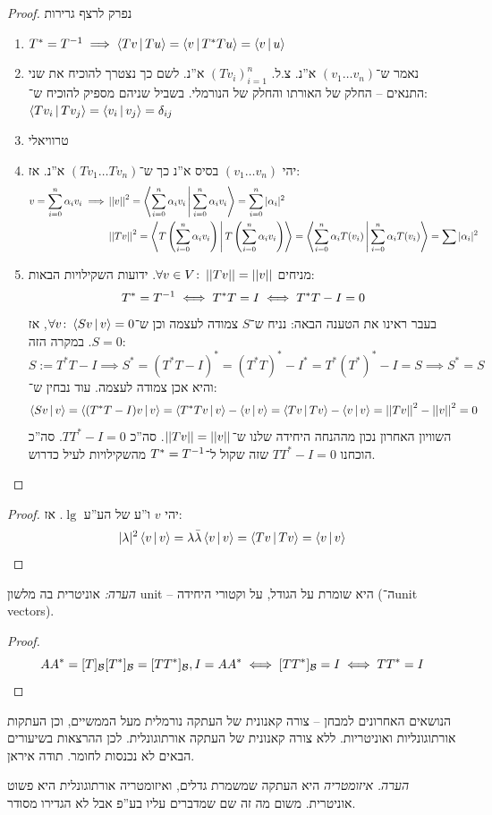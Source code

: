 \documentclass[]{../../../../tex/classes/styledArticle}
\begin{document}
	\begin{proof}נפרק לרצף גרירות
		\begin{enumerate}
			\item[$1 \to 2$] \hfil $T^* = T\op \implies \mut{Tv}{Tu} = \mut{v}{T^*Tu} = \mut{v}{u}$
			\item[$2 \to 3$] נאמר ש־$(v_1 \dots v_n)$ א''נ. צ.ל. $(Tv_i)_{i = 1}^{n}$ א''נ. לשם כך נצטרך להוכיח את שני התנאים – החלק של האורתו והחלק של הנורמלי. בשביל שניהם מספיק להוכיח ש־: 
				$\mut{Tv_i}{Tv_j} = \mut{v_i}{v_j}  = \dg_{ij}$
			\item[$3 \to 4$]טרוויאלי
			\item[$4 \to 5$]יהי $(v_1 \dots v_n)$ בסיס א''נ כך ש־$(Tv_1 \dots Tv_n)$ א''נ. אז: 
			\begin{align*}
				v = \sumni \ag_i v_i \implies &\norm{v}^2 = \mut{\sumni \ag_i v_i}{\sumni \ag_i v_i} = \sumni |\ag_i|^2 \\
				&\norm{Tv}^2 = \mut{T\cl{\sumni \ag_i v_i}}{T\cl{\sumni \ag_i v_i}} = \mut{\sumni \ag_i T(v_i)}{\sumni \ag_i T(v_i)} = \sum |\ag_i|^2
			\end{align*}
			\item[$5 \to 1$]מניחים $\forall v \in V \co \norm{Tv} = \norm{v}$. ידועות השקילויות הבאות: 
			\[ T^* = T\op \iff T^*T = I \iff T^*T - I = 0 \]
			בעבר ראינו את הטענה הבאה: נניח ש־$S$ צמודה לעצמה וכן ש־$\forall v \co \mut{Sv}{v} = 0$, אז $S = 0$. במקרה הזה: 
			\[ S := T^*T - I \implies S^* = (T^*T - I)^* = (T^*T)^* - I^* = T^*(T^*)^* - I =S \implies S^* = S \]
			והיא אכן צמודה לעצמה. עוד נבחין ש־: 
			\[ \mut{Sv}{v} = \mut{(T^* T - I)v}{v} =\mut{T^*Tv}{v} - \mut{v}{v} = \mut{Tv}{Tv} - \mut{v}{v} = \norm{Tv}^2 - \norm{v}^2 = 0 \]
			השוויון האחרון נכון מההנחה היחידה שלנו ש־$\norm{Tv} = \norm{v}$. סה''כ $TT^* - I = 0$. סה''כ הוכחנו $TT^* - I = 0$ שזה שקול ל־$T^* = T\op$ מהשקילויות לעיל כדרוש. 
		\end{enumerate}
	\end{proof}
	
	 \begin{proof}
		יהי $v$ ו''ע של הע''ע $\lg$. אז: 
		\[ |\lg|^2 \mut{v}{v} = \lg\bar\lg \mut{v}{v} = \mut{Tv}{Tv} = \mut{v}{v} \]
	\end{proof}
	\textit{הערה: }אוניטרית בה מלשון unit – היא שומרת על הגודל, על וקטורי היחידה (ה־unit vectors). 
	\begin{proof}
		\[ AA^* = [T]_\bc[T^*]_\bc = [TT^*]_\bc, I = AA^* \iff [TT^*]_\bc = I \iff TT^* = I \]
	\end{proof}
	
	הנושאים האחרונים למבחן – צורה קאנונית של העתקה נורמלית מעל הממשיים, וכן העתקות אורתוגונליות ואוניטריות. ללא צורה קאנונית של העתקה אורתוגונלית. לכן ההרצאות בשיעורים הבאים לא נכנסות לחומר. תודה איראן. 
	
	\textit{הערה. }\textit{איזומטריה} היא העתקה שמשמרת גדלים, ואיזומטריה אורתוגונלית היא פשוט אוניטרית. משום מה זה שם שמדברים עליו בע''פ אבל לא הגדירו מסודר. 
	\ndoc
\end{document}

